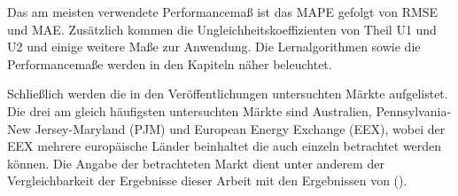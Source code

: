Das am meisten verwendete Performancemaß ist das MAPE gefolgt von RMSE und MAE. Zusätzlich kommen die Ungleichheitskoeffizienten von Theil U1 und U2 und einige weitere Maße zur Anwendung. Die Lernalgorithmen sowie die Performancemaße werden in den Kapiteln  näher beleuchtet.

Schließlich werden die in den Veröffentlichungen untersuchten Märkte aufgelistet. Die drei am gleich häufigsten untersuchten Märkte sind Australien, Pennsylvania-New Jersey-Maryland (PJM) und European Energy Exchange (EEX), wobei der EEX mehrere europäische Länder beinhaltet die auch einzeln betrachtet werden können. Die Angabe der betrachteten Markt dient unter anderem der Vergleichbarkeit der Ergebnisse dieser Arbeit mit den Ergebnissen von \citet{Panapakidis2016}(). 











